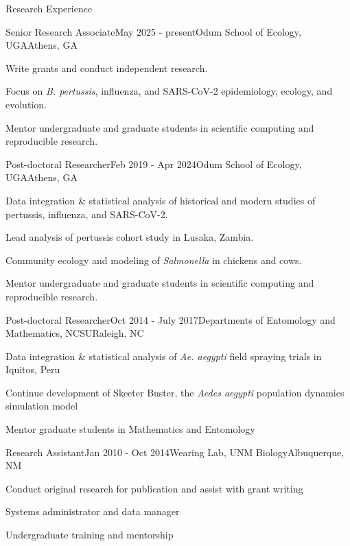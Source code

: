 \documentclass{resume} %
\begin{document}
\begin{rSection}{Research Experience}

\begin{rSubsection}{Senior Research Associate}{May 2025 - present}{Odum School of Ecology, UGA}{Athens, GA}
\item Write grants and conduct independent research.
\item Focus on \textit{B. pertussis}, influenza, and SARS-CoV-2 epidemiology, ecology, and evolution.
\item Mentor undergraduate and graduate students in scientific computing and reproducible research.
\end{rSubsection}

\begin{rSubsection}{Post-doctoral Researcher}{Feb 2019 - Apr 2024}{Odum School of Ecology, UGA}{Athens, GA}
\item Data integration \& statistical analysis of historical and modern studies of pertussis, influenza, and SARS-CoV-2.
\item Lead analysis of pertussis cohort study in Lusaka, Zambia.
\item Community ecology and modeling of \textit{Salmonella} in chickens and cows.
\item Mentor undergraduate and graduate students in scientific computing and reproducible research.
\end{rSubsection}

\clearpage

\begin{rSubsection}{Post-doctoral Researcher}{Oct 2014 - July 2017}{Departments of
Entomology and Mathematics, NCSU}{Raleigh, NC}
\item Data integration \& statistical analysis of {\em Ae. aegypti} field spraying trials in Iquitos, Peru
\item Continue development of Skeeter Buster, the {\em Aedes aegypti} population dynamics simulation model
\item Mentor graduate students in Mathematics and Entomology
\end{rSubsection}

\begin{rSubsection}{Research Assistant}{Jan 2010 - Oct 2014}{Wearing Lab, UNM Biology}{Albuquerque, NM}
\item Conduct original research for publication and assist with grant writing
\item Systems administrator and data manager
\item Undergraduate training and mentorship
\end{rSubsection}


\end{rSection}
\end{document}
